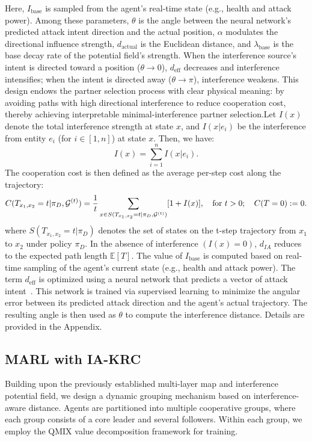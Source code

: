 \documentclass[10pt]{article} %
\begin{document}
Here, \(I_{\text{base}}\) is sampled from the agent's real-time state (e.g., health and attack power). Among these parameters, \(\theta\) is the angle between the neural network's predicted attack intent direction and the actual position, \(\alpha\) modulates the directional influence strength, \(d_{\text{actual}}\) is the Euclidean distance, and \(\lambda_{\text{base}}\) is the base decay rate of the potential field's strength. When the interference source's intent is directed toward a position (\(\theta \to 0\)), \(d_{\text{eff}}\) decreases and interference intensifies; when the intent is directed away (\(\theta \to \pi\)), interference weakens. This design endows the partner selection process with clear physical meaning: by avoiding paths with high directional interference to reduce cooperation cost, thereby achieving interpretable minimal-interference partner selection.Let \(I(x)\) denote the total interference strength at state \(x\), and \(I(x|e_i)\) be the interference from entity \(e_i\) (for \(i \in [1, n]\)) at state \(x\). Then, we have:
\[
I(x) = \sum_{i=1}^{n} I(x|e_i).
\]
The cooperation cost is then defined as the average per-step cost along the trajectory:
\[
\begin{gathered}
C(T_{x_1,x_2}=t|\pi_D, \mathcal{G}^{(t)})
= \frac{1}{t}\sum_{x \in S(T_{x_1,x_2}=t|\pi_D, \mathcal{G}^{(t)})} [1 + I(x)], \text{\quad for } t>0;\quad C(T=0):=0.
\end{gathered}
\]
where \(S(T_{x_1,x_2}=t|\pi_D)\) denotes the set of states on the t-step trajectory from \(x_1\) to \(x_2\) under policy \(\pi_D\). In the absence of interference \((I(x)=0)\), \(d_{IA}\) reduces to the expected path length \(\mathbb{E}[T]\).
The value of \(I_{\text{base}}\) is computed based on real-time sampling of the agent's current state (e.g., health and attack power). The term \(d_{\text{eff}}\) is optimized using a neural network that predicts a vector of attack intent~\citep{casas2018intentnet}. This network is trained via supervised learning to minimize the angular error between its predicted attack direction and the agent's actual trajectory. The resulting angle is then used as \(\theta\) to compute the interference distance. Details are provided in the Appendix.

\subsection{MARL with IA-KRC}

Building upon the previously established multi-layer map and interference potential field, we design a dynamic grouping mechanism based on interference-aware distance. Agents are partitioned into multiple cooperative groups, where each group consists of a core leader and several followers. Within each group, we employ the QMIX value decomposition framework for training.
\end{document}
